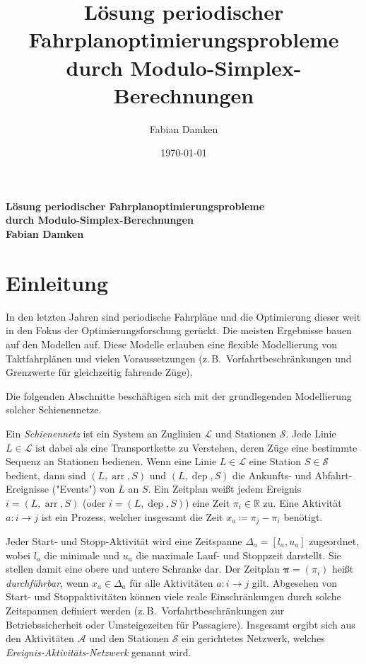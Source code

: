 \documentclass[a4paper, 11pt, twocolumn]{scrartcl}
\title{Lösung periodischer Fahrplanoptimierungsprobleme durch Modulo-Simplex-Berechnungen}
\author{Fabian Damken}
\date{\today}
\newcommand{\R}{\ensuremath{\mathbb{R}}}
\renewcommand{\vec}[1]{\mathbf{#1}}
\DeclareMathOperator{\arr}{arr}
\DeclareMathOperator{\dep}{dep}
\newcommand{\zB}{z.\,B.~}
\begin{document}
	

	\makeatletter
	\begin{center}
		\textbf{\Large Lösung periodischer \mbox{Fahrplanoptimierungsprobleme} \\ \vspace{2mm} durch Modulo-Simplex-Berechnungen} \\ \vspace{3mm}
		\textbf{\large Fabian Damken} \\ \vspace{1mm}
		{\large \@date}
	\end{center}
	\makeatother

	\section{Einleitung}
		In den letzten Jahren sind periodische Fahrpläne und die Optimierung dieser weit in den Fokus der Optimierungsforschung gerückt. Die meisten Ergebnisse bauen auf den Modellen \cite{serafiniMathematicalModelPeriodic1989} auf. Diese Modelle erlauben eine flexible Modellierung von Taktfahrplänen und vielen Voraussetzungen (\zB Vorfahrtbeschränkungen und Grenzwerte für gleichzeitig fahrende Züge).
		
		Die folgenden Abschnitte beschäftigen sich mit der grundlegenden Modellierung solcher Schienennetze.
		
		Ein \emph{Schienennetz} ist ein System an Zuglinien \(\mathcal{L}\) und Stationen \(\mathcal{S}\). Jede Linie \(L \in \mathcal{L}\) ist dabei als eine Transportkette zu Verstehen, deren Züge eine bestimmte Sequenz an Stationen bedienen. Wenn eine Linie \(L \in \mathcal{L}\) eine Station \(S \in \mathcal{S}\) bedient, dann sind \( (L, \arr, S) \) und \( (L, \dep, S) \) die Ankunfts- und Abfahrt-Ereignisse ("Events") von \(L\) an \(S\). Ein Zeitplan weißt jedem Ereignis \( i = (L, \arr, S) \) (oder \( i = (L, \dep, S) \)) eine Zeit \( \pi_i \in \R \) zu. Eine Aktivität \( a : i \to j \) ist ein Prozess, welcher insgesamt die Zeit \( x_a \coloneqq \pi_j - \pi_i \) benötigt.
		
		Jeder Start- und Stopp-Aktivität wird eine Zeitspanne \( \Delta_a = [l_a, u_a] \) zugeordnet, wobei \( l_a \) die minimale und \( u_a \) die maximale Lauf- und Stoppzeit darstellt. Sie stellen damit eine obere und untere Schranke dar. Der Zeitplan \( \vec{\pi} = (\pi_i) \) heißt \emph{durchführbar}, wenn \( x_a \in \Delta_a \) für alle Aktivitäten \( a : i \to j \) gilt. Abgesehen von Start- und Stoppaktivitäten können viele reale Einschränkungen durch solche Zeitspannen definiert werden (\zB Vorfahrtbeschränkungen zur Betriebssicherheit oder Umsteigezeiten für Passagiere). Insgesamt ergibt sich aus den Aktivitäten \(\mathcal{A}\) und den Stationen \(\mathcal{S}\) ein gerichtetes Netzwerk, welches \emph{Ereignis-Aktivitäts-Netzwerk} genannt wird.
		
\end{document}
